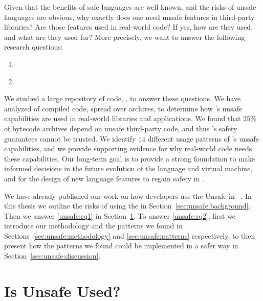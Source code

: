 Given that the benefits of safe languages are well known,
and the risks of unsafe languages are obvious,
why exactly does one need unsafe features in third-party libraries?
Are those features used in real-world code?
If yes, how are they used, and what are they used for?
More precisely, we want to answer the following research questions:

\begin{enumerate}[label=$RQ/U\arabic*:$,ref=$RQ/U\arabic*$,leftmargin=3.4\parindent]
\item\label{unsafe:rq1} {\bf \urqA} \urqAdesc{}
\item\label{unsafe:rq2} {\bf \urqB} \urqBdesc{}
\end{enumerate}

We studied a large repository of \java{} code, \mavencentral{},
to answer these questions.
We have analyzed \statreposize{} of compiled \java{} code,
spread over \statrepouniquearts{} \java{} archives,
to determine how \java{}'s unsafe capabilities are used in real-world
libraries and applications.
We found that $25\%$ of \java{} bytecode archives depend on unsafe
third-party \java{} code, and thus \java{}'s safety
guarantees cannot be trusted.
We identify $14$ different usage patterns of \java{}'s unsafe capabilities,
and we provide supporting evidence for why real-world code needs these capabilities.
Our long-term goal is to provide a strong foundation
to make informed decisions in the future evolution of the \java{} language and virtual machine,
and for the design of new language features to regain safety in \java{}.

We have already published our work on how developers use the Unsafe \api{} in \java{}~\citep{mastrangeloUseYourOwn2015}.
In this thesis we outline the risks of using the \unsafe{} \api{} in Section~\ref{sec:unsafe:background}.
Then we answer \ref{unsafe:rq1} in Section~\ref{sec:unsafe:overview}.
To answer \ref{unsafe:rq2}, first we introduce our methodology and the patterns we found in Sections~\ref{sec:unsafe:methodology} and \ref{sec:unsafe:patterns} respectively, to then present how the patterns we found could be implemented in a safer way in Section~\ref{sec:unsafe:discussion}.



\section{Is Unsafe Used?}
\label{sec:unsafe:overview}

